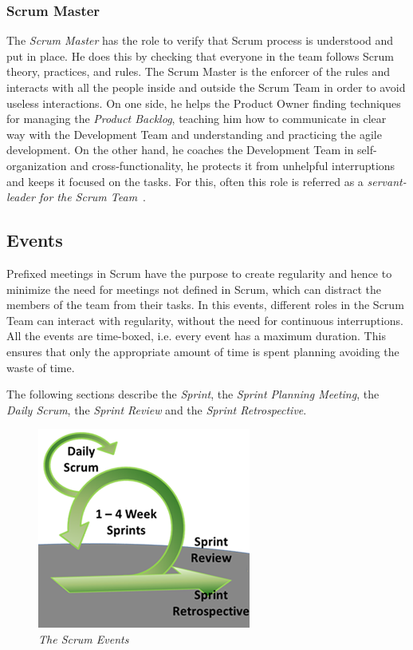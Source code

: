 			\subsubsection{Scrum Master}\label{ref_scrum_master}
			The \emph{Scrum Master} has the role to verify that Scrum process is understood and put in place. He does this by checking that everyone in the team follows Scrum theory, practices, and rules. 
			The Scrum Master is the enforcer of the rules and interacts with all the people inside and outside the Scrum Team in order to avoid useless interactions.
			On one side, he helps the Product Owner finding techniques for managing the \emph{Product Backlog}, teaching him how to communicate in clear way with the Development Team and understanding and practicing the agile development. On the other hand, he coaches the Development Team in self-organization and cross-functionality, he protects it from unhelpful interruptions and keeps it focused on the tasks. 
			For this, often this role is referred as a \emph{servant-leader for the Scrum Team}~\cite{scrumEnglishGuide}.


		\subsection{Events}\label{ref_scrum_events}
			Prefixed meetings in Scrum have the purpose to create regularity and hence to minimize the need for meetings not defined in Scrum, which can distract the members of the team from their tasks. In this events, different roles in the Scrum Team can interact with regularity, without the need for continuous interruptions. All the events are time-boxed, i.e. every event has a maximum duration. This ensures that only the appropriate amount of time is spent planning avoiding the waste of time. 

			The following sections describe the \emph{Sprint}, the \emph{Sprint Planning Meeting}, the \emph{Daily Scrum}, the \emph{Sprint Review} and the \emph{Sprint Retrospective}.

			\begin{figure}[h]
			  \begin{center} 
			    \includegraphics[scale=0.8]{images/ch_04/scrum_events.png}
			  \end{center} 
			  \caption{\textit{The Scrum Events}}  
			  \label{fig:ScrumEvents}
		  	\end{figure}
			


